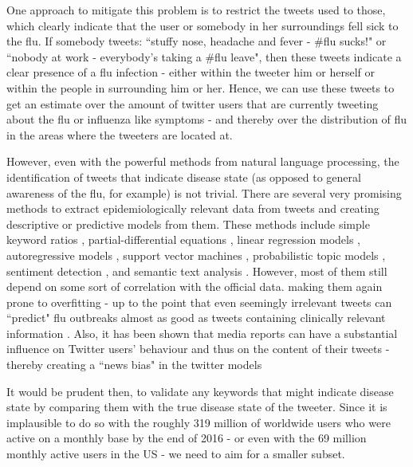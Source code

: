 \documentclass[11pt, a4paper,twoside]{report}\usepackage[]{graphicx}\usepackage[]{color}
\begin{document}
One approach to mitigate this problem is to restrict the tweets used to those, which clearly indicate that the user or somebody in her surroundings fell sick to the flu. If somebody tweets: ``stuffy nose, headache and fever - \#flu sucks!" or ``nobody at work - everybody's taking a \#flu leave", then these tweets indicate a clear presence of a flu infection - either within the tweeter him or herself or within the people in surrounding him or her. Hence, we can use these tweets to get an estimate over the amount of twitter users that are currently tweeting about the flu or influenza like symptoms - and thereby over the distribution of flu in the areas where the tweeters are located at.\newline

However, even with the powerful methods from natural language processing, the identification of tweets that indicate disease state (as opposed to general awareness of the flu, for example) is not trivial. There are several very promising methods to extract epidemiologically relevant data from tweets and creating descriptive or predictive models from them. These methods include simple keyword ratios \citep{lampos_tracking_2010}, partial-differential equations \citep{wang_regional_2016}, linear regression models \citep{culotta_towards_2010}, autoregressive models \citep{achrekar_predicting_2011,paul_twitter_2014,paul_worldwide_2015}, support vector machines \citep{paul_you_2011}, probabilistic topic models \citep{paul_you_2011}, sentiment detection \citep{aramaki_twitter_2011}, and semantic text analysis \citep{lamb_separating_2013}. However, most of them still depend on some sort of correlation with the official data. making them again prone to overfitting - up to the point that even seemingly irrelevant tweets can ``predict" flu outbreaks almost as good as tweets containing clinically relevant information \citep{bodnar_validating_2013}. Also, it has been shown that media reports can have a substantial influence on Twitter users' behaviour and thus on the content of their tweets - thereby creating a ``news bias" in the twitter models \citep{aramaki_twitter_2011}\newline

It would be prudent then, to validate any keywords that might indicate disease state by comparing them with the true disease state of the tweeter. Since it is implausible to do so with the roughly 319 million of worldwide users who were active on a monthly base by the end of 2016 - or even with the 69 million monthly active users in the US \citep{twitter_annual_2017} - we need to aim for a smaller subset.\newline
\end{document}
